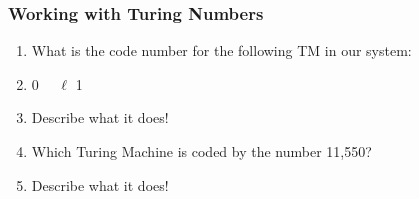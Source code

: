 \begin{frame}
\frametitle{Working with Turing Numbers}


\begin{enumerate}[<+->]

\item What is the code number for the following TM in our system:
\item[] 0 \ub \, \ub \, $\ell$ 1

\item[] Describe what it does!


\item Which Turing Machine is coded by the number 11,550?

\item[] Describe what it does!



\end{enumerate}
\end{frame}

